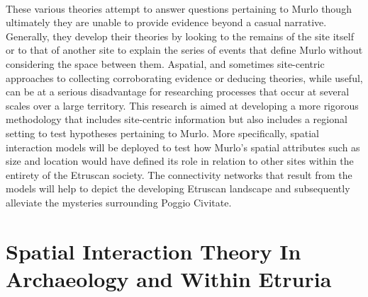\documentclass[12pt,a4paper]{thesis}
\begin{document}
\paragraph{}	
These various theories attempt to answer questions pertaining to Murlo though ultimately they are unable to provide evidence beyond a casual narrative.  Generally, they develop their theories by looking to the remains of the site itself or to that of another site to explain the series of events that define Murlo without considering the space between them. Aspatial, and sometimes site-centric approaches to collecting corroborating evidence or deducing theories, while useful, can be at a serious disadvantage for researching processes that occur at several scales over a large territory. This research is aimed at developing a more rigorous methodology that includes site-centric information but also includes a regional setting to test hypotheses pertaining to Murlo. More specifically, spatial interaction models will be deployed to test how Murlo's spatial attributes such as size and location would have defined its role in relation to other sites within the entirety of the Etruscan society.  The connectivity networks that result from the models will help to depict the developing Etruscan landscape and subsequently alleviate the mysteries surrounding Poggio Civitate.


\section{Spatial Interaction Theory In Archaeology and Within Etruria}
\end{document}
